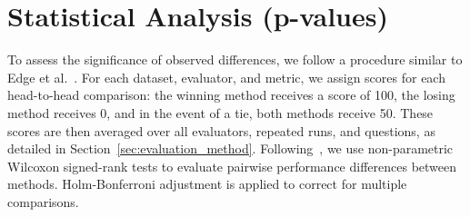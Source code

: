 \section{Statistical Analysis (p-values)} \label{sec:p_values_appendix}
To assess the significance of observed differences, we follow a procedure similar to Edge et al.~\cite{edge24}. 
For each dataset, evaluator, and metric, we assign scores for each head-to-head comparison: the winning method receives a score of 100, the losing method receives 0, and in the event of a tie, both methods receive 50.  These scores are then averaged over all evaluators, repeated runs, and questions, as detailed in Section~\ref{sec:evaluation_method}.
Following~\cite{edge24}, we use non-parametric Wilcoxon signed-rank tests to evaluate pairwise performance differences between methods. 
Holm-Bonferroni adjustment is applied to correct for multiple comparisons.


\begin{table}[!t]
\centering
\caption{Wilcoxon signed-rank test p-values for comparisons across datasets and baselines on Diversity (\threepointfive). Significant values are highlighted in \textbf{bold} for $p<0.005$.}
\label{tab:p_values_diversity}
\end{table}




